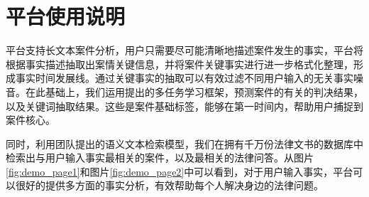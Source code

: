 \section{平台使用说明}
平台支持长文本案件分析，用户只需要尽可能清晰地描述案件发生的事实，平台将根据事实描述抽取出案情关键信息，并将案件关键事实进行进一步格式化整理，形成事实时间发展线。通过关键事实的抽取可以有效过滤不同用户输入的无关事实噪音。在此基础上，我们运用提出的多任务学习框架，预测案件的有关的判决结果，以及关键词抽取结果。这些是案件基础标签，能够在第一时间内，帮助用户捕捉到案件核心。

同时，利用团队提出的语义文本检索模型，我们在拥有千万份法律文书的数据库中检索出与用户输入事实最相关的案件，以及最相关的法律问答。从图片\ref{fig:demo_page1}和图片\ref{fig:demo_page2}中可以看到，对于用户输入事实，平台可以很好的提供多方面的事实分析，有效帮助每个人解决身边的法律问题。

